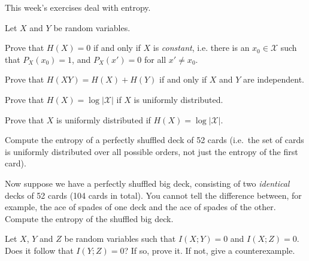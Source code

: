 \documentclass[a4paper,10pt,landscape,twocolumn]{scrartcl}
\begin{document}
\practiceproblems

{\sffamily\noindent
This week's exercises deal with entropy. \practiceinstructions
}

\begin{exercise}
Let $X$ and $Y$ be random variables.
	\begin{subex}
	Prove that $H(X) = 0$ if and only if $X$ is \emph{constant}, i.e. there is an $x_0 \in \mathcal{X}$ such that $P_X(x_0) = 1$, and $P_X(x') = 0$ for all $x' \neq x_0$.
	\end{subex}
	
	\begin{subex}
	Prove that $H(XY) = H(X) + H(Y)$ if and only if $X$ and $Y$ are independent.
	\end{subex}

	\begin{subex}
	Prove that $H(X) = \log |\mathcal{X}|$ if $X$ is uniformly distributed.
	\end{subex}

	\begin{subex**}
	Prove that $X$ is uniformly distributed if $H(X) = \log |\mathcal{X}|$.
	\end{subex**}
	
\end{exercise}

\begin{exercise}
	\begin{subex}
	Compute the entropy of a perfectly shuffled deck of 52 cards
        (i.e.\ the set of cards is uniformly distributed over all
        possible orders, not just the entropy of the first card).
	\end{subex}
	
	\begin{subex}
	Now suppose we have a perfectly shuffled big deck, consisting of two \emph{identical} decks of 52 cards (104 cards in total). You cannot tell the difference between, for example, the ace of spades of one deck and the ace of spades of the other. Compute the entropy of the shuffled big deck.
	\end{subex}
\end{exercise}


\begin{exercise}
Let $X$, $Y$ and $Z$ be random variables such that $I(X;Y) = 0$ and $I(X;Z) = 0$. Does it follow that $I(Y;Z) = 0$? If so, prove it. If not, give a counterexample.
\end{exercise}
\end{document}
